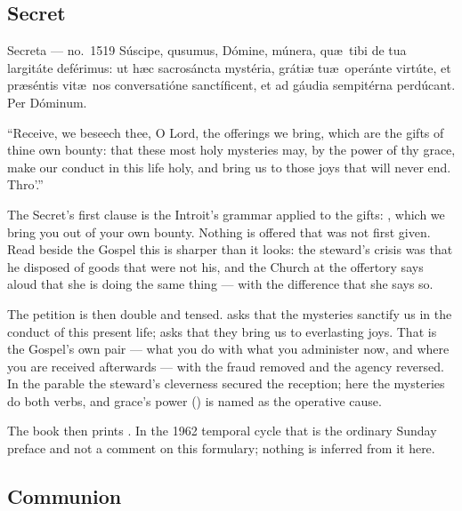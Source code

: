 \subsection{Secret }

\begin{appointed}{Secreta --- no.\ 1519}
Súscipe, qu\aeacute sumus, Dómine, múnera, qu\ae\ tibi de tua largitáte
deférimus: ut h\ae c sacrosáncta mystéria, grátiæ tu\ae\ operánte virtúte, et
pr\ae séntis vit\ae\ nos conversatióne sanctíficent, et ad gáudia sempitérna
perdúcant. Per Dóminum.
\end{appointed}

\begin{englishwitness}
``Receive, we beseech thee, O Lord, the offerings we bring, which are the gifts
of thine own bounty: that these most holy mysteries may, by the power of thy
grace, make our conduct in this life holy, and bring us to those joys that will
never end. Thro'.''
\end{englishwitness}

The Secret's first clause is the Introit's grammar applied to the gifts:
, which we bring you out of your
own bounty. Nothing is offered that was not first given. Read beside the Gospel
this is sharper than it looks: the steward's crisis was that he disposed of
goods that were not his, and the Church at the offertory says aloud that she is
doing the same thing --- with the difference that she says so.

The petition is then double and tensed.  asks that the mysteries sanctify us in the conduct
of this present life;  asks that they
bring us to everlasting joys. That is the Gospel's own pair --- what you do with
what you administer now, and where you are received afterwards --- with the
fraud removed and the agency reversed. In the parable the steward's cleverness
secured the reception; here the mysteries do both verbs, and grace's power
() is named as the operative cause.

The book then prints . In the 1962 temporal
cycle that is the ordinary Sunday preface and not a comment on this formulary;
nothing is inferred from it here.

\subsection{Communion }

